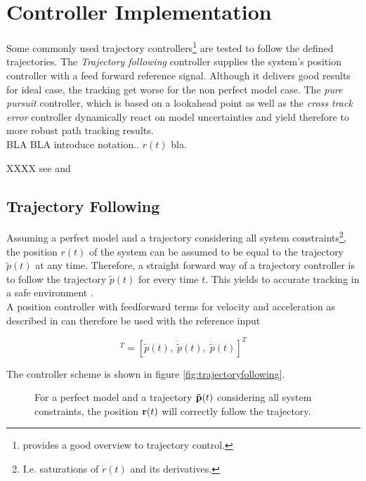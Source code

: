 \section{Controller Implementation}
Some commonly used trajectory controllers\footnote{\cite{snider} provides a good overview to trajectory control.} are tested to follow the defined trajectories. The \textit{Trajectory following} controller supplies the system's position controller \cite{meier} with a feed forward reference signal. Although it delivers good results for ideal case, the tracking get worse for the non perfect model case. The \textit{pure pursuit} controller, which is based on a lookahead point as well as the \textit{cross track error} controller dynamically react on model uncertainties and yield therefore to more robust path tracking results.
\\
BLA BLA introduce notation.. $r(t)$ bla.

 XXXX see \cite{snider} and \cite{deluca}
\label{sec:controllerImplementation}
\subsection{Trajectory Following}
Assuming a perfect model and a trajectory considering all system constraints\footnote{I.e. saturations of $\dot{r}(t)$ and its derivatives.}, the position $r\left(t\right)$ of the system can be assumed to be equal to the trajectory $\tilde{p}(t)$ at any time. Therefore, a straight forward way of a trajectory controller is to follow the trajectory $\tilde{p}(t)$ for every time $t$. This yields to accurate tracking in a safe environment \cite{doesegger}.
\\
A position controller with feedforward terms for velocity and acceleration as described in \cite{meiermueri} can therefore be used with the reference input

\begin{equation}
  [r_{ref}(t), \; \dot{r}_{ref}(t), \; \ddot{r}_{ref}(t)]^T = [\tilde{p}(t), \; \dot{\tilde{p}}(t), \; \ddot{\tilde{p}}(t)]^T
\end{equation}

The controller scheme is shown in figure \ref{fig:trajectoryfollowing}. 

\begin{figure}[h]
    \centering
    \def\svgwidth{0.4\columnwidth}
    
    \caption{For a perfect model and a trajectory ${\bf \tilde{p}}(t)$ considering all system constraints, the position ${\bf{r}}(t)$ will correctly follow the trajectory.}
    \label{fig:scene_trajectoryFollowing}
\end{figure}

